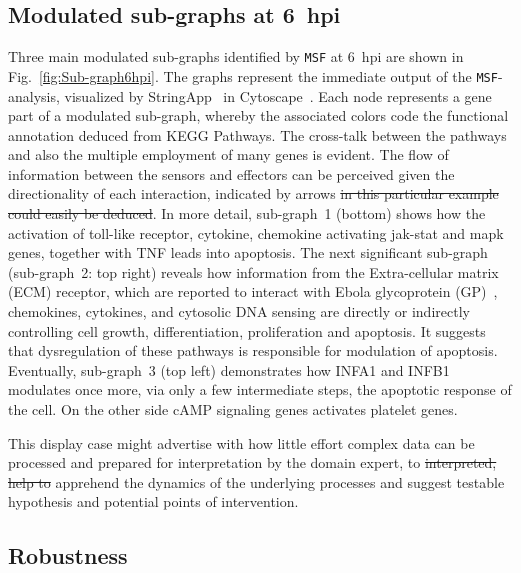 \documentclass[10pt,a4paper,twocolumn]{article}
\newcommand{\FA}[1]{\begingroup\color{magenta}#1\endgroup}
\begin{document}
	\subsection*{Modulated sub-graphs at 6~hpi}
	
	Three main modulated sub-graphs identified by \texttt{MSF} at
        6~hpi are shown in Fig.~\ref{fig:Sub-graph6hpi}. The graphs
        represent the immediate output of the \texttt{MSF}-analysis,
        visualized by StringApp~\cite{StringApp} in
        Cytoscape~\cite{Cyto}. Each node represents a gene part of a
        modulated sub-graph, whereby the associated colors code the
        functional annotation deduced from KEGG Pathways. The
        cross-talk between the pathways and also the multiple
        employment of many genes is evident. The flow of information
        between the sensors and effectors can be perceived given the
        directionality of each interaction, indicated by arrows
        \sout{in this particular example could easily be deduced}.  In
        more detail, sub-graph~1 (bottom) shows how the activation of
        toll-like receptor, cytokine, chemokine activating jak-stat
        and mapk genes, together with TNF leads into apoptosis. The
        next significant sub-graph (sub-graph~2: top right) reveals
        how information from the Extra-cellular matrix (ECM) receptor,
        which are reported to interact with Ebola glycoprotein
        (GP)~\cite{Veljkovic}, chemokines, cytokines, and cytosolic
        DNA sensing are directly or indirectly controlling cell
        growth, differentiation, proliferation and apoptosis. It
        suggests that dysregulation of these pathways is responsible
        for modulation of apoptosis. Eventually, sub-graph~3 (top
        left) demonstrates how INFA1 and INFB1 modulates once more,
        via only a few intermediate steps, the apoptotic response of
        the cell. On the other side cAMP signaling genes activates
        platelet genes.
	
	This display case might advertise with how little effort
        complex data can be \FA{processed and prepared for
          interpretation by the domain expert, to } \sout{interpreted,
          help to} apprehend the dynamics of the underlying processes
        and suggest testable hypothesis and potential points of
        intervention.
	
	\subsection*{Robustness}
	
\end{document}
